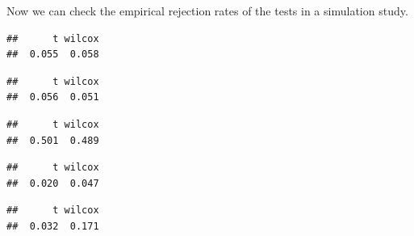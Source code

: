 Now we can check the empirical rejection rates of the tests in a
simulation study.
\begin{knitrout}
\color{fgcolor}\begin{kframe}
\begin{alltt}
 \hlkwb{<-} 
 \hlkwb{<-}   \hlstd{))}
 \hlopt{<} \hlstd{)}
\end{alltt}
\begin{verbatim}
##      t wilcox 
##  0.055  0.058
\end{verbatim}
\begin{alltt}
 \hlkwb{<-} \hlstd{(}\hlstd{,} \hlstd{,} \hlstd{,}  \hlstd{=} \hlstd{,}  \hlstd{=} \hlstd{) \{}
     \hlkwb{<-}  
     \hlopt{<} 
\hlstd{\}}

 \hlstd{)}
\end{alltt}
\begin{verbatim}
##      t wilcox 
##  0.056  0.051
\end{verbatim}
\begin{alltt}
 \hlstd{)}
\end{alltt}
\begin{verbatim}
##      t wilcox 
##  0.501  0.489
\end{verbatim}
\begin{alltt}
 \hlstd{)}
\end{alltt}
\begin{verbatim}
##      t wilcox 
##  0.020  0.047
\end{verbatim}
\begin{alltt}
 \hlstd{)}
\end{alltt}
\begin{verbatim}
##      t wilcox 
##  0.032  0.171
\end{verbatim}
\end{kframe}
\end{knitrout}

